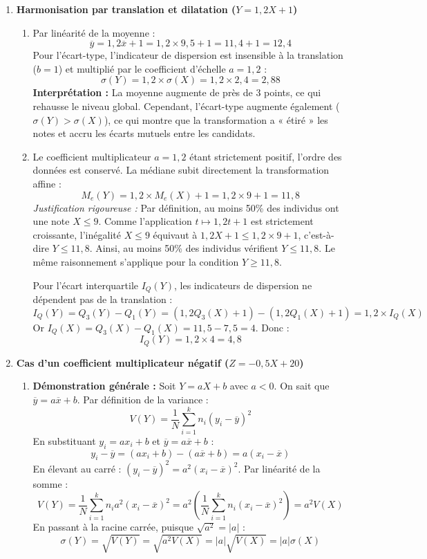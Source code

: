 \documentclass[11pt,a4paper]{article}
\begin{document}
\begin{enumerate}
    \item \textbf{Harmonisation par translation et dilatation ($Y = 1,2X + 1$)}
    \begin{enumerate}
        \item Par linéarité de la moyenne :
        \[ \overline{y} = 1,2\overline{x} + 1 = 1,2 \times 9,5 + 1 = 11,4 + 1 = 12,4 \]
        Pour l'écart-type, l'indicateur de dispersion est insensible à la translation ($b=1$) et multiplié par le coefficient d'échelle $a = 1,2$ :
        \[ \sigma(Y) = 1,2 \times \sigma(X) = 1,2 \times 2,4 = 2,88 \]
        \textbf{Interprétation :} La moyenne augmente de près de $3$ points, ce qui rehausse le niveau global. Cependant, l'écart-type augmente également ($\sigma(Y) > \sigma(X)$), ce qui montre que la transformation a « étiré » les notes et accru les écarts mutuels entre les candidats.
        
        \item Le coefficient multiplicateur $a = 1,2$ étant strictement positif, l'ordre des données est conservé. La médiane subit directement la transformation affine :
        \[ M_e(Y) = 1,2 \times M_e(X) + 1 = 1,2 \times 9 + 1 = 11,8 \]
        \textit{Justification rigoureuse :} Par définition, au moins 50\% des individus ont une note $X \le 9$. Comme l'application $t \mapsto 1,2t+1$ est strictement croissante, l'inégalité $X \le 9$ équivaut à $1,2X+1 \le 1,2\times9+1$, c'est-à-dire $Y \le 11,8$. Ainsi, au moins 50\% des individus vérifient $Y \le 11,8$. Le même raisonnement s'applique pour la condition $Y \ge 11,8$.
        
        Pour l'écart interquartile $I_Q(Y)$, les indicateurs de dispersion ne dépendent pas de la translation :
        \[ I_Q(Y) = Q_3(Y) - Q_1(Y) = (1,2Q_3(X)+1) - (1,2Q_1(X)+1) = 1,2 \times I_Q(X) \]
        Or $I_Q(X) = Q_3(X) - Q_1(X) = 11,5 - 7,5 = 4$. Donc :
        \[ I_Q(Y) = 1,2 \times 4 = 4,8 \]
    \end{enumerate}

    \item \textbf{Cas d'un coefficient multiplicateur négatif ($Z = -0,5X + 20$)}
    \begin{enumerate}
        \item \textbf{Démonstration générale :} Soit $Y = aX+b$ avec $a < 0$. On sait que $\overline{y} = a\overline{x}+b$.
        Par définition de la variance :
        \[ V(Y) = \frac{1}{N}\sum_{i=1}^{k} n_i (y_i - \overline{y})^2 \]
        En substituant $y_i = ax_i + b$ et $\overline{y} = a\overline{x} + b$ :
        \[ y_i - \overline{y} = (ax_i + b) - (a\overline{x} + b) = a(x_i - \overline{x}) \]
        En élevant au carré : $(y_i - \overline{y})^2 = a^2 (x_i - \overline{x})^2$. Par linéarité de la somme :
        \[ V(Y) = \frac{1}{N}\sum_{i=1}^{k} n_i a^2 (x_i - \overline{x})^2 = a^2 \left( \frac{1}{N}\sum_{i=1}^{k} n_i (x_i - \overline{x})^2 \right) = a^2 V(X) \]
        En passant à la racine carrée, puisque $\sqrt{a^2} = |a|$ :
        \[ \sigma(Y) = \sqrt{V(Y)} = \sqrt{a^2 V(X)} = |a|\sqrt{V(X)} = |a|\sigma(X) \]
        

\end{enumerate}
\end{enumerate}
\end{document}
